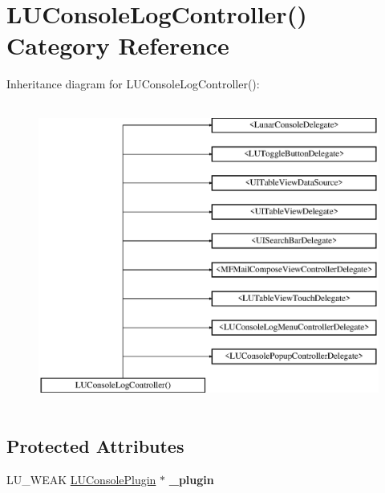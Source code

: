 \hypertarget{category_l_u_console_log_controller_07_08}{}\section{L\+U\+Console\+Log\+Controller() Category Reference}
\label{category_l_u_console_log_controller_07_08}
Inheritance diagram for L\+U\+Console\+Log\+Controller()\+:\begin{figure}[H]
\begin{center}
\leavevmode
\includegraphics[height=10.000000cm]{category_l_u_console_log_controller_07_08}
\end{center}
\end{figure}
\subsection*{Protected Attributes}
\begin{DoxyCompactItemize}
\item 
\mbox{\label{category_l_u_console_log_controller_07_08_af7150ae2b1ce7c2860d728c68bb39340}} 
L\+U\+\_\+\+W\+E\+AK \mbox{\hyperlink{interface_l_u_console_plugin}{L\+U\+Console\+Plugin}} $\ast$ {\bfseries \+\_\+plugin}
\end{DoxyCompactItemize}
